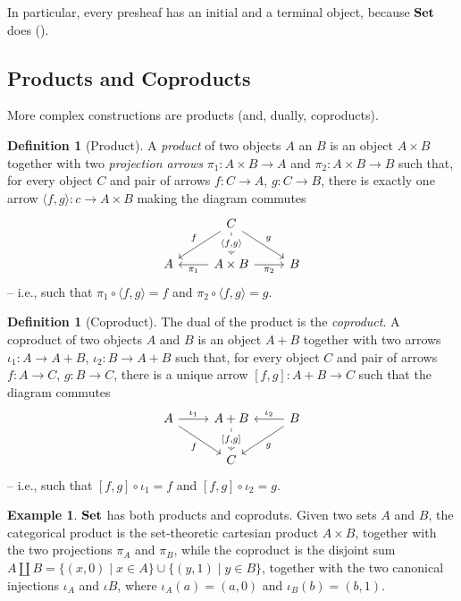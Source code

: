 \documentclass[a4paper, twoside,openright]{report}
\theoremstyle{plain}
\theoremstyle{definition}
\newtheorem{definition}[theorem]{Definition}
\newtheorem{example}[theorem]{Example}
\begin{document}
In particular, every presheaf has an initial and a terminal object, because $\mathbf{Set}$ does ().

\subsection{Products and Coproducts}

More complex constructions are products (and, dually, coproducts).

\begin{definition}[Product]
    A \emph{product} of two objects $A$ an $B$ is an object $A \times B$ together with two \emph{projection arrows} $\pi_1:A\times B \rightarrow A$ and $\pi_2: A \times B \rightarrow B$ such that, for every object $C$ and pair of arrows $f: C \rightarrow A$, $g: C \rightarrow B$, there is exactly one arrow $\langle f, g \rangle : c \rightarrow A \times B$ making the diagram commutes
    \[
        \begin{tikzcd}
                    & C \arrow[dl, "f" swap] \arrow[d, dashed, "{\langle f, g \rangle}" description] \arrow[dr, "g"] & \\
                A   & A \times B  \arrow[l, "{\pi_1}"] \arrow[r, "{\pi_2}" swap]    &  B    
        \end{tikzcd}
    \]
   -- i.e., such that $\pi_1 \circ \langle f, g \rangle = f$ and $\pi_2 \circ \langle f, g \rangle  = g$.
    
\end{definition}


\begin{definition}[Coproduct]
    The dual of the product is the \emph{coproduct}.
    A coproduct of two objects $A$ and $B$ is an object $A + B$ together with two arrows $\iota_1:A\rightarrow A+B$, $\iota_2: B \rightarrow A + B$ such that, for every object $C$ and pair of arrows $f:A \rightarrow C$, $g:B \rightarrow C$, there is a unique arrow $[f, g] : A + B \rightarrow C$ such that the diagram commutes
    \[
        \begin{tikzcd}
            A \arrow[r, "{\iota_1}"] \arrow[dr, "f" swap] & A+B \arrow[d, dashed, "{[f,g]}" description] & B \arrow[l, "{\iota_2}" swap] \arrow[dl, "g"] \\
            & C & 
        \end{tikzcd}
    \]
    -- i.e., such that $[f, g] \circ \iota_1 = f$ and $[f, g] \circ \iota_2 = g$.
\end{definition}

\begin{example}
    $\mathbf{Set}$ has both products and coproduts. Given two sets $A$ and $B$, the categorical product is the set-theoretic cartesian product $A \times B$, together with the two projections $\pi_A$ and $\pi_B$, while the coproduct is the disjoint sum $A \amalg B = \{ (x, 0) \mid x \in A\} \cup \{(y, 1) \mid y \in B \}$, together with the two canonical injections $\iota_A$ and $\iota B$, where $\iota_A(a) = (a, 0)$ and $\iota_B(b) = (b, 1)$. 
\end{example}
\end{document}
